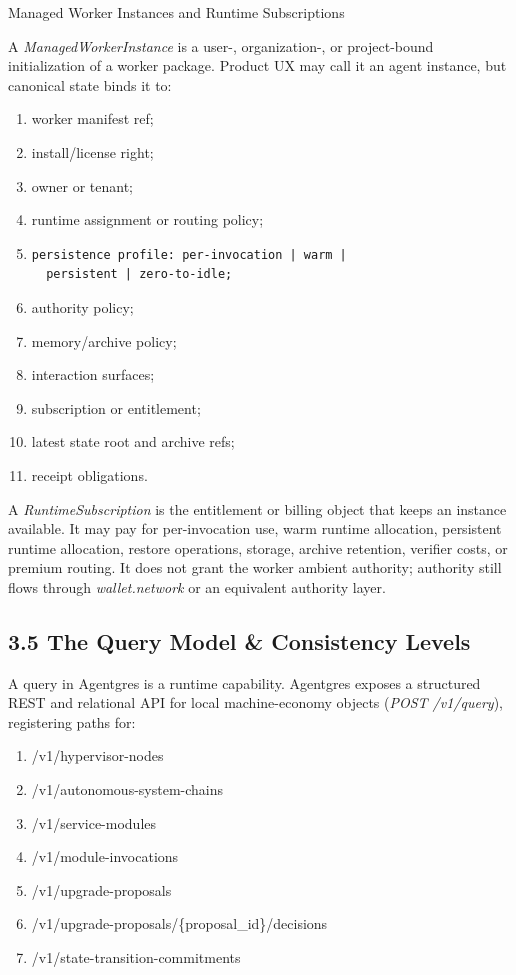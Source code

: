 \documentclass[
  11pt,
]{article}
\providecommand{\tightlist}{%
  \setlength{\itemsep}{0pt}\setlength{\parskip}{0pt}}
\begin{document}
Managed Worker Instances and Runtime Subscriptions

A \emph{ManagedWorkerInstance} is a user-, organization-, or
project-bound initialization of a worker package. Product UX may call it
an agent instance, but canonical state binds it to:

\begin{enumerate}
\def\labelenumi{\arabic{enumi}.}
\tightlist
\item
  worker manifest ref;
\item
  install/license right;
\item
  owner or tenant;
\item
  runtime assignment or routing policy;
\item
\begin{lstlisting}[language={},basicstyle=\ttfamily\scriptsize]
  persistence profile: per-invocation | warm |
  persistent | zero-to-idle;
\end{lstlisting}
\item
  authority policy;
\item
  memory/archive policy;
\item
  interaction surfaces;
\item
  subscription or entitlement;
\item
  latest state root and archive refs;
\item
  receipt obligations.
\end{enumerate}

A \emph{RuntimeSubscription} is the entitlement or billing object that
keeps an instance available. It may pay for per-invocation use, warm
runtime allocation, persistent runtime allocation, restore operations,
storage, archive retention, verifier costs, or premium routing. It does
not grant the worker ambient authority; authority still flows through
\emph{wallet.network} or an equivalent authority layer.

\hypertarget{the-query-model-consistency-levels}{%
\subsection{3.5 The Query Model \& Consistency
Levels}\label{the-query-model-consistency-levels}}

A query in Agentgres is a runtime capability. Agentgres exposes a
structured REST and relational API for local machine-economy objects
(\emph{POST /v1/query}), registering paths for:

\begin{enumerate}
\def\labelenumi{\arabic{enumi}.}
\tightlist
\item
  /v1/hypervisor-nodes
\item
  /v1/autonomous-system-chains
\item
  /v1/service-modules
\item
  /v1/module-invocations
\item
  /v1/upgrade-proposals
\item
  /v1/upgrade-proposals/\{proposal\_id\}/decisions
\item
  /v1/state-transition-commitments
\end{enumerate}
\end{document}
